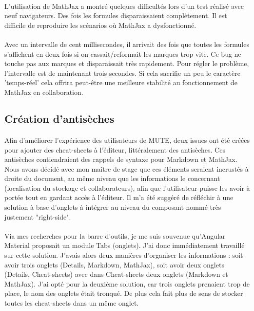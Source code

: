 \documentclass[12pt]{article}
\begin{document}
\paragraph{}
L'utilisation de MathJax a montré quelques difficultés lors d'un test réalisé avec neuf navigateurs. Des fois les formules disparaissaient complètement. Il est difficile de reproduire les scénarios où MathJax a dysfonctionné.
\paragraph{}
Avec un intervalle de cent millisecondes, il arrivait des fois que toutes les formules s'affichent en deux fois si on cassait/reformait les marques trop vite. Ce bug ne touche pas aux marques et disparaissait très rapidement. Pour régler le problème, l'intervalle est de maintenant trois secondes. Si cela sacrifie un peu le caractère 'temps-réel' cela offrira peut-être une meilleure stabilité au fonctionnement de MathJax en collaboration.

\newpage
\subsection{Création d'antisèches}
\paragraph{}
Afin d'améliorer l'expérience des utilisateurs de MUTE, deux issues ont été créées pour ajouter des cheat-sheets à l'éditeur, littéralement des antisèches. Ces antisèches contiendraient des rappels de syntaxe pour Markdown et MathJax. Nous avons décidé avec mon maître de stage que ces éléments seraient incrustés à droite du document, au même niveau que les informations le concernant (localisation du stockage et collaborateurs), afin que l'utilisateur puisse les avoir à portée tout en gardant accès à l'éditeur. Il m'a été suggéré de réfléchir à une solution à base d'onglets à intégrer au niveau du composant nommé très justement "right-side".
\paragraph{}
Via mes recherches pour la barre d'outils, je me suis souvenue qu'Angular Material proposait un module Tabs (onglets). J'ai donc immédiatement travaillé sur cette solution. J'avais alors deux manières d'organiser les informations : soit avoir trois onglets (Details, Markdown, MathJax), soit avoir deux onglets (Details, Cheat-sheets) avec dans Cheat-sheets deux onglets (Markdown et MathJax). J'ai opté pour la deuxième solution, car trois onglets prenaient trop de place, le nom des onglets était tronqué. De plus cela fait plus de sens de stocker toutes les cheat-sheets dans un même onglet.\\
\end{document}
